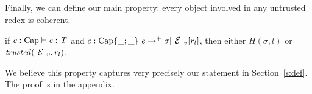${}_{}$

\noindent Finally, we can define our main property: every object involved in any untrusted redex
is coherent.

\begin{Theorem}
if $c:\text{Cap}\vdash {\ensuremath{\mathit{e}}}: {\mathit{T}}$ and
$c:\text{Cap}\{\_;\_\}|\e\rightarrow^+ \sigma|\ctx_v[r_l]$, then
either $H(\sigma,l)$ or $\mathit{trusted}(\ctx_v,r_l)$.
\end{Theorem}

We believe this property captures very precisely our statement in Section~\ref{s:def}.
The proof is in the appendix. 
